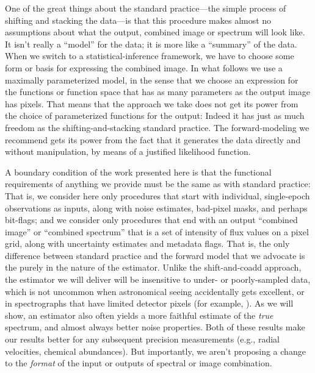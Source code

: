 \documentclass[modern]{aastex631}
\begin{document}
One of the great things about the standard practice---the simple process of shifting and stacking the data---is that this procedure makes almost no assumptions about what the output, combined image or spectrum will look like.
It isn't really a ``model'' for the data; it is more like a ``summary'' of the data.
When we switch to a statistical-inference framework, we have to choose some form or basis for expressing the combined image.
In what follows we use a maximally parameterized model, in the sense that we choose an expression for the functions or function space that has as many parameters as the output image has pixels.
That means that the approach we take does not get its power from the choice of parameterized functions for the output:
Indeed it has just as much freedom as the shifting-and-stacking standard practice.
The forward-modeling we recommend gets its power from the fact that it generates the data directly and without manipulation, by means of a justified likelihood function.

A boundary condition of the work presented here is that the functional requirements of anything we provide must be the same as with standard practice:
That is, we consider here only procedures that start with individual, single-epoch observations as inputs, along with noise estimates, bad-pixel masks, and perhaps bit-flags; and we consider only procedures that end with an output ``combined image'' or ``combined spectrum'' that is a set of intensity of flux values on a pixel grid, along with uncertainty estimates and metadata flags.
That is, the only difference between standard practice and the forward model that we advocate is the purely in the nature of the estimator.
Unlike the shift-and-coadd approach, the estimator we will deliver will be insensitive to under- or poorly-sampled data, which is not uncommon when astronomical seeing accidentally gets excellent, or in spectrographs that have limited detector pixels (for example, \citealt{apogeehardware}).
As we will show, an estimator also often yields a more faithful estimate of the \emph{true} spectrum, and almost always better noise properties.
Both of these results make our results better for any subsequent precision measurements (e.g., radial velocities, chemical abundances).
But importantly, we aren't proposing a change to the \emph{format} of the input or outputs of spectral or image combination.

\end{document}
